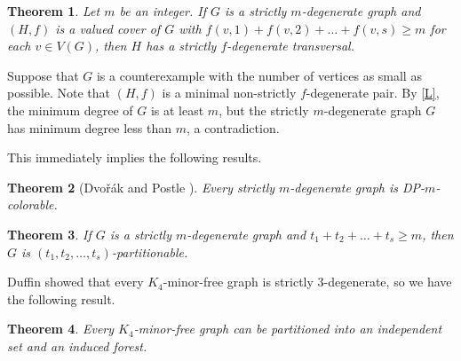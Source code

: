 \documentclass{article}
\makeatletter
\renewenvironment{proof}[1][\proofname]{\par
  \pushQED{\qed}%
  \normalfont \topsep6\p@\@plus6\p@\relax
  \trivlist
  \item[\hskip\labelsep
        \bfseries
    #1\@addpunct{.}]\ignorespaces
}{%
  \popQED\endtrivlist\@endpefalse
}
\newtheorem{theorem}{Theorem}[section]
\theoremstyle{definition}
\makeatother
\begin{document}
\begin{theorem}\label{THM-5.1}
Let $m$ be an integer. If $G$ is a strictly $m$-degenerate graph and $(H, f)$ is a valued cover of $G$ with $f(v, 1) + f(v, 2) + \dots + f(v, s) \geq m$ for each $v \in V(G)$, then $H$ has a strictly $f$-degenerate transversal. 
\end{theorem}
\begin{proof}
Suppose that $G$ is a counterexample with the number of vertices as small as possible. Note that $(H, f)$ is a minimal non-strictly $f$-degenerate pair. By \autoref{L}, the minimum degree of $G$ is at least $m$, but the strictly $m$-degenerate graph $G$ has minimum degree less than $m$, a contradiction. 
\end{proof}

This immediately implies the following results. 
\begin{theorem}[Dvo\v{r}\'{a}k and Postle \cite{MR3758240}]
Every strictly $m$-degenerate graph is DP-$m$-colorable. 
\end{theorem}
\begin{theorem}
If $G$ is a strictly $m$-degenerate graph and $t_{1} + t_{2} + \dots + t_{s} \geq m$, then $G$ is $(t_{1}, t_{2}, \dots, t_{s})$-partitionable. 
\end{theorem}
Duffin \cite{MR0175809} showed that every $K_{4}$-minor-free graph is strictly $3$-degenerate, so we have the following result. 
\begin{theorem}
Every $K_{4}$-minor-free graph can be partitioned into an independent set and an induced forest. 
\end{theorem}
\end{document}

